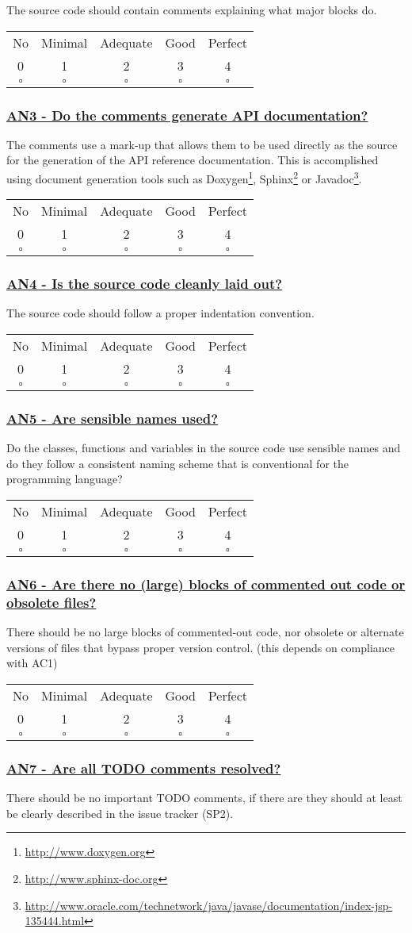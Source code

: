 \documentclass[a4paper,11pt]{article}
\newcommand{\criterion}[2]{\subsubsection*{\underline{#1 - #2}}\label{id:#1}}
\newcommand\CheckTable{%
  \begin{tabular}{ccccc}
    No & Minimal & Adequate & Good & Perfect \\
    0 & 1 & 2 & 3 & 4 \\
    \hline
    $\square$ & $\square$ & $\square$ & $\square$ & $\square$ \\
  \end{tabular}%
}
\begin{document}
The source code should contain comments explaining what major blocks do.

\CheckTable

\newcommand{\anThreeID}{AN3}
\newcommand{\anThreeText}{Do the comments generate API documentation?}
\criterion{\anThreeID}{\anThreeText}

The comments use a mark-up that allows them to be used directly as the
source for the generation of the API reference documentation. This is
%
%
%
accomplished using document generation tools such as Doxygen\footnote{\url{http://www.doxygen.org}}, Sphinx\footnote{\url{http://www.sphinx-doc.org}} or
Javadoc\footnote{\url{http://www.oracle.com/technetwork/java/javase/documentation/index-jsp-135444.html}}.

\CheckTable

\newcommand{\anFourID}{AN4}
\newcommand{\anFourText}{Is the source code cleanly laid out?}
\criterion{\anFourID}{\anFourText}

The source code should follow a proper indentation convention. 

\CheckTable

\newcommand{\anFiveID}{AN5}
\newcommand{\anFiveText}{Are sensible names used?}
\criterion{\anFiveID}{\anFiveText}

Do the classes, functions and variables in the source code use sensible names
and do they follow a consistent naming scheme that is conventional for the
programming language?

\CheckTable

\newcommand{\anSixID}{AN6}
\newcommand{\anSixText}{Are there no (large) blocks of commented out code or obsolete files?}
\criterion{\anSixID}{\anSixText}

There should be no large blocks of commented-out code, nor obsolete or
alternate versions of files that bypass proper version control.
(this depends on compliance with AC1)

\CheckTable

\newcommand{\anSevenID}{AN7}
\newcommand{\anSevenText}{Are all TODO comments resolved?}
\criterion{\anSevenID}{\anSevenText}

There should be no important TODO comments, if there are they should at least be
clearly described in the issue tracker (SP2).
\end{document}
